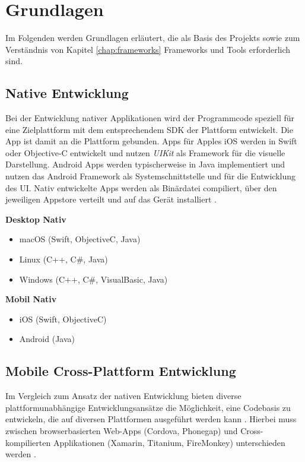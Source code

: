 
\chapter{Grundlagen}

Im Folgenden werden Grundlagen erläutert, die als Basis des Projekts sowie zum Verständnis von Kapitel \ref{chap:frameworks} Frameworks und Tools erforderlich sind.


\section{Native Entwicklung}

Bei der Entwicklung nativer Applikationen wird der Programmcode speziell für eine Zielplattform mit dem entsprechendem \ac{SDK} der Plattform entwickelt.
Die App ist damit an die Plattform gebunden. Apps für Apples iOS werden in Swift oder Objective-C entwickelt und nutzen \emph{UIKit} als Framework für die visuelle Darstellung.
Android Apps werden typischerweise in Java implementiert und nutzen das Android Framework als Systemschnittstelle und für die Entwicklung des \ac{UI}.
Nativ entwickelte Apps werden als Binärdatei compiliert, über den jeweiligen Appstore verteilt und auf das Gerät installiert \cite{Heitkoetter2013}.

\vspace{0.3cm}
\textbf{Desktop Nativ}
\begin{itemize}
\item macOS (Swift, ObjectiveC, Java)
\item Linux (C++, C\#, Java)
\item Windows (C++, C\#, VisualBasic, Java)
\end{itemize}
\vspace{0.3cm}

\textbf{Mobil Nativ}
\begin{itemize}
\item iOS (Swift, ObjectiveC)
\item Android (Java)
\end{itemize}
\vspace{0.3cm}

\section{Mobile Cross-Plattform Entwicklung}

Im Vergleich zum Ansatz der nativen Entwicklung bieten diverse plattformunabhängige Entwicklungsansätze die Möglichkeit, eine Codebasis zu entwickeln,
die auf diversen Plattformen ausgeführt werden kann \cite{Heitkoetter2013}.
Hierbei muss zwischen browserbasierten Web-Apps (Cordova, Phonegap) und Cross-kompilierten Applikationen (Xamarin, Titanium, FireMonkey) unterschieden werden
\cite{Xamar84:online}.

